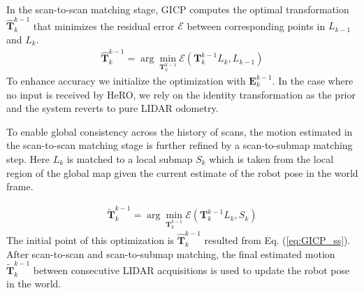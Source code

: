 \documentclass[letterpaper, 10pt, conference]{ieeeconf}      %
\newcommand{\rev}[1]{{\color{blue}#1}} %
\begin{document}
In the scan-to-scan matching stage, GICP computes the optimal transformation $\hat{\textbf{T}}^{k-1}_{k}$ that minimizes the residual error $\mathcal{E}$ between corresponding points in $L_{k-1}$ and $L_{k}$. 
\begin{align}\label{eq:GICP_ss}
\hat{\textbf{T}}^{k-1}_{k} = \arg\min_{\textbf{T}^{k-1}_{k}} \mathcal{E} (\textbf{T}^{k-1}_{k}L_{k}, L_{k-1})
\end{align}
To enhance accuracy we initialize the optimization with $\textbf{E}^{k-1}_{k}$. In the case where no input is received by HeRO, we rely on the identity transformation as the prior and the system reverts to pure \rev{LIDAR} odometry. 


To enable global consistency across the history of scans, the motion estimated in the scan-to-scan matching stage is further refined by a scan-to-submap matching step. 
\rev{Here $L_k$ is matched to a local submap $S_k$ which is taken from the local region of the global map given the current estimate of the robot pose in the world frame.}



\begin{align}\label{eq:GICP_map}
\tilde{\textbf{T}}^{k-1}_{k} = \arg\min_{\textbf{T}^{k-1}_{k}} \mathcal{E} (\textbf{T}^{k-1}_{k}L_{k}, S_{k})
\end{align}
The initial point of this optimization is $\hat{\textbf{T}}^{k-1}_{k}$ resulted from Eq. (\ref{eq:GICP_ss}).
After scan-to-scan and scan-to-submap matching, the final estimated motion $\tilde{\textbf{T}}^{k-1}_{k}$ between consecutive LIDAR acquisitions is used to update the robot pose in the world.%
\end{document}
